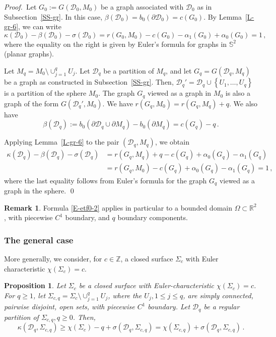 \documentclass[12pt,a4paper]{amsart}
\theoremstyle{plain} %
\newtheorem{proposition}[theorem]{Proposition}
\theoremstyle{definition}
\newtheorem{remark}[theorem]{Remark}
\numberwithin{equation}{section}
\numberwithin{figure}{section}
\numberwithin{table}{section}
\newcommand{\R}{\mathbb{R}}
\newcommand{\bS}{\mathbb{S}}
\newcommand{\cD}{\mathcal{D}}
\newcommand{\pf}{\emph{Proof.~}}
\newcommand{\sm}{\!\setminus\!}
\newcommand{\set}[1]{\left\lbrace #1 \right\rbrace}
\newcommand{\bD}{\partial \cD}
\begin{document}
\pf  Let $G_0 := G(\cD_0,M_0)$ be a graph associated with $\cD_0$ as in Subsection~\ref{SS-gr}.  In this case, $\beta(\cD_0) = b_0(\bD_0) = c(G_0)$. By Lemma~\ref{L-gr-6}, we can write
%
\begin{equation*}
\kappa(\cD_0) - \beta(\cD_0) - \sigma(\cD_0) = r(G_0,M_0) -c(G_0) - \alpha_1(G_0) + \alpha_0(G_0) = 1\,,
\end{equation*}
%
where the equality on the right is given by Euler's formula for graphs in $\bS^2$ (planar graphs). \medskip

Let $M_q = M_0 \sm \cup_{j=1}^q U_j$. Let $\cD_q$ be a partition of $M_q$, and let $G_q = G(\cD_q,M_q)$ be a graph as constructed in Subsection~\ref{SS-gr}. Then, $\cD_q' = \cD_q \cup \set{U_1,\ldots,U_q}$ is a partition of the sphere $M_0$. The graph $G_q$ viewed as a graph in $M_0$ is also a graph of the form $G(\cD_q',M_0)$. We have $r(G_q,M_0) = r(G_q,M_q) + q$. We also have
%
\begin{equation*}
\beta(\cD_q) := b_0(\bD_q \cup \partial M_q) - b_0(\partial M_q) = c(G_q) - q\,.
\end{equation*}

Applying Lemma~\ref{L-gr-6} to the pair $(\cD_q,M_q)$, we obtain
%
\begin{equation*}
\begin{split}
\kappa(\cD_q) - \beta(\cD_q) - \sigma(\cD_q) & = r(G_q,M_q) + q - c(G_q) + \alpha_0(G_q) - \alpha_1(G_q)\\[5pt]
& = r(G_q,M_0) - c(G_q) + \alpha_0(G_q) - \alpha_1(G_q) = 1\,,
\end{split}%
\end{equation*}
 where the last equality follows from Euler's formula for the graph $G_q$ viewed as a graph in the sphere. \hfill \qed


\begin{remark}\label{R-etf0-2P}
Formula \eqref{E-etf0-2} applies in particular to a bounded domain $\Omega \subset \R^2$, with piecewise $C^1$ boundary, and $q$ boundary components.
\end{remark}%


\subsubsection{The general case}\label{SS-etfc}

More generally, we consider,  for $c\in \mathbb Z$,  a closed surface $\Sigma_{c}$ with Euler characteristic $\chi(\Sigma_c)=c$.

\begin{proposition}\label{P-etfc-2}
Let $\Sigma_c$ be a closed surface with Euler-characteristic $\chi(\Sigma_c)=c$. For $q \ge 1$, let $\Sigma_{c,q} = \Sigma_c\sm \cup_{j=1}^q U_j$, where the $U_j, 1 \le j \le q$, are simply connected, pairwise disjoint, open sets, with piecewise $C^1$ boundary. Let $\mathcal D_q$ be a regular partition of $\Sigma_{c,q}, q\ge 0$. Then,
\begin{equation}\label{E-etfc-2}
\kappa(\cD_q,\Sigma_{c,q}) \ge  \chi(\Sigma_c) - q + \sigma(\cD_q,\Sigma_{c,q}) = \chi(\Sigma_{c,q}) + \sigma(\cD_q,\Sigma_{c,q})\,.
\end{equation}
\end{proposition}
\end{document}
